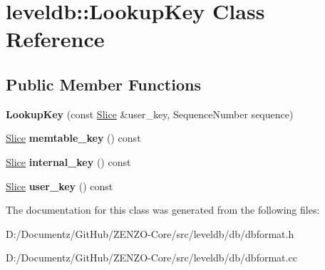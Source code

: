 \hypertarget{classleveldb_1_1_lookup_key}{}\section{leveldb\+::Lookup\+Key Class Reference}
\label{classleveldb_1_1_lookup_key}
\subsection*{Public Member Functions}
\begin{DoxyCompactItemize}
\item 
\mbox{\label{classleveldb_1_1_lookup_key_acd09aa56607ced962e1b458d05d53472}} 
{\bfseries Lookup\+Key} (const \mbox{\hyperlink{classleveldb_1_1_slice}{Slice}} \&user\+\_\+key, Sequence\+Number sequence)
\item 
\mbox{\label{classleveldb_1_1_lookup_key_aa53ebf124713e32632a7aaaee359ac22}} 
\mbox{\hyperlink{classleveldb_1_1_slice}{Slice}} {\bfseries memtable\+\_\+key} () const
\item 
\mbox{\label{classleveldb_1_1_lookup_key_a3ba069ced6c871a1f420487e8ca99fc1}} 
\mbox{\hyperlink{classleveldb_1_1_slice}{Slice}} {\bfseries internal\+\_\+key} () const
\item 
\mbox{\label{classleveldb_1_1_lookup_key_a35812939729922656f6dc98c43216265}} 
\mbox{\hyperlink{classleveldb_1_1_slice}{Slice}} {\bfseries user\+\_\+key} () const
\end{DoxyCompactItemize}


The documentation for this class was generated from the following files\+:\begin{DoxyCompactItemize}
\item 
D\+:/\+Documentz/\+Git\+Hub/\+Z\+E\+N\+Z\+O-\/\+Core/src/leveldb/db/dbformat.\+h\item 
D\+:/\+Documentz/\+Git\+Hub/\+Z\+E\+N\+Z\+O-\/\+Core/src/leveldb/db/dbformat.\+cc\end{DoxyCompactItemize}
